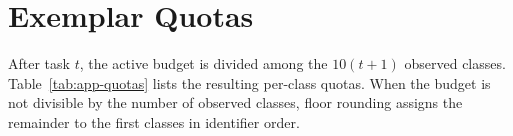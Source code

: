 \section{Exemplar Quotas}
\label{app:quotas}

After task $t$, the active budget is divided among the $10(t+1)$ observed
classes.  Table~\ref{tab:app-quotas} lists the resulting per-class quotas.
When the budget is not divisible by the number of observed classes, floor
rounding assigns the remainder to the first classes in identifier order.

\begin{table}[htbp]
  \centering
  \caption{Per-class active exemplar quota after each task. Ranges indicate
  the one-exemplar difference induced by floor rounding.}
  \label{tab:app-quotas}
  \small
\end{table}
